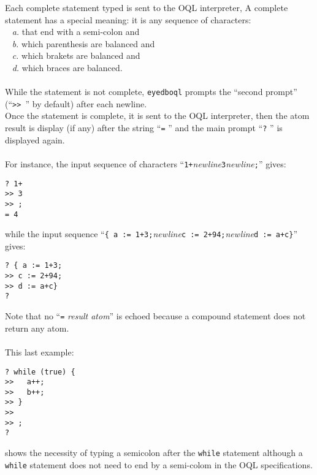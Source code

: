 Each complete statement typed is sent to the OQL interpreter,
A complete statement has a special meaning: it is any sequence of characters:\\
\mbox{ } \emph{a.} that end with a semi-colon and\\
\mbox{ } \emph{b.} which parenthesis are balanced and\\
\mbox{ } \emph{c.} which brakets are balanced and\\
\mbox{ } \emph{d.} which braces are balanced.\\
\\
While the statement is not complete, \texttt{eyedboql} prompts the
``second prompt'' (``\texttt{>> }'' by default) after each newline.\\
Once the statement is complete, it is sent to the OQL interpreter, then
the atom result is display (if any) after the string ``\texttt{=} ''
and the main prompt ``\texttt{?} '' is displayed again.\\\\
For instance, the input sequence of characters
``\texttt{1+}\emph{newline}\texttt{3}\emph{newline}\texttt{;}'' gives:
\verbsize
\begin{verbatim}
? 1+
>> 3
>> ;
= 4
\end{verbatim}
\normalsize
while the input sequence ``\texttt{\{ a := 1+3;}\emph{newline}\texttt{c := 2+94;}\emph{newline}\texttt{d := a+c\}}'' gives:
\verbsize
\begin{verbatim}
? { a := 1+3;
>> c := 2+94;
>> d := a+c}
?
\end{verbatim}
\normalsize
Note that no ``\texttt{=} \emph{result atom}'' is echoed because a compound
statement does not return any atom.
\\
\\
This last example:
\verbsize
\begin{verbatim}
? while (true) {
>>   a++;
>>   b++;
>> }
>>
>> ;
?
\end{verbatim}
\normalsize
shows the necessity of typing a semicolon after the \texttt{while} statement
although a \texttt{while} statement does not need to end by a semi-colom
in the OQL specifications.

